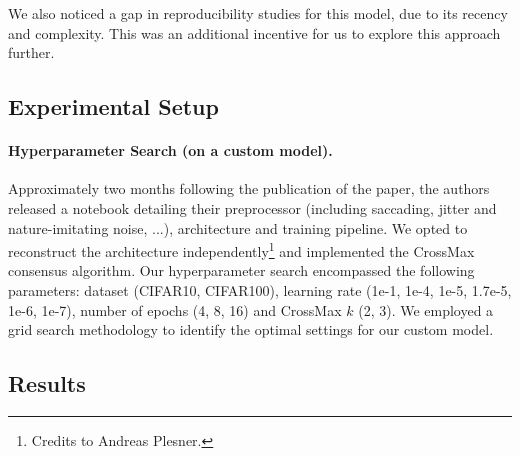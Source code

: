 \documentclass[a4paper, oneside]{discothesis}
\begin{document}
We also noticed a gap in reproducibility studies for this model, due to its recency and complexity. This was an additional incentive for us to explore this approach further.

\subsection{Experimental Setup}

\paragraph{Hyperparameter Search (on a custom model).}

Approximately two months following the publication of the paper, the authors released a notebook detailing their preprocessor (including saccading, jitter and nature-imitating noise, ...), architecture and training pipeline. We opted to reconstruct the architecture independently\footnote{Credits to Andreas Plesner.} and implemented the CrossMax consensus algorithm. Our hyperparameter search encompassed the following parameters: dataset (CIFAR10, CIFAR100), learning rate (1e-1, 1e-4, 1e-5, 1.7e-5, 1e-6, 1e-7), number of epochs (4, 8, 16) and CrossMax $k$ (2, 3). We employed a grid search methodology to identify the optimal settings for our custom model.



\subsection{Results}
\end{document}
